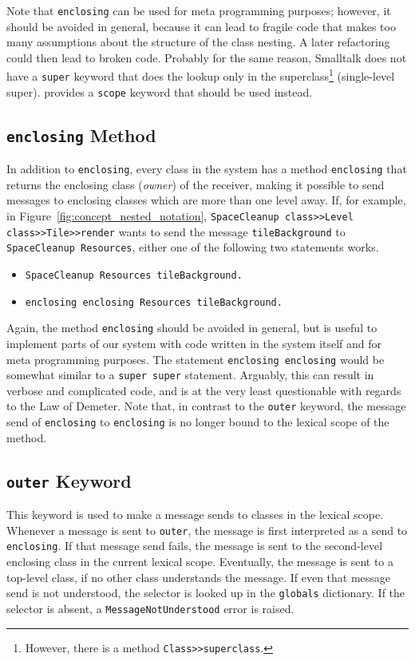 Note that \texttt{enclosing} can be used for meta programming purposes; however, it should be avoided in general, because it can lead to fragile code that makes too many assumptions about the structure of the class nesting. A later refactoring could then lead to broken code. Probably for the same reason, Smalltalk does not have a \texttt{super} keyword that does the lookup only in the superclass\footnote{However, there is a method \texttt{Class>>superclass}.} (single-level super). \msname provides a \texttt{scope} keyword that should be used instead.

\subsection{\texttt{enclosing} Method}
In addition to \texttt{enclosing}, every class in the system has a method \texttt{enclosing} that returns the enclosing class (\emph{owner}) of the receiver, making it possible to send messages to enclosing classes which are more than one level away. If, for example, in Figure~\ref{fig:concept_nested_notation}, \texttt{SpaceCleanup class>>Level class>>Tile>>render} wants to send the message \texttt{tileBackground} to \texttt{SpaceCleanup Resources}, either one of the following two statements works.

\begin{itemize}
	\item \texttt{SpaceCleanup Resources tileBackground.}
	\item \texttt{enclosing enclosing Resources tileBackground.}
\end{itemize}

Again, the method \texttt{enclosing} should be avoided in general, but is useful to implement parts of our system with code written in the system itself and for meta programming purposes. The statement \texttt{enclosing enclosing} would be somewhat similar to a \texttt{super super} statement. Arguably, this can result in verbose and complicated code, and is at the very least questionable with regards to the Law of Demeter. Note that, in contrast to the \texttt{outer} keyword, the message send of \texttt{enclosing} to \texttt{enclosing} is no longer bound to the lexical scope of the method.

\subsection{\texttt{outer} Keyword}
\label{sec:concept_outer}
This keyword is used to make a message sends to classes in the lexical scope. Whenever a message is sent to \texttt{outer}, the message is first interpreted as a send to \texttt{enclosing}. If that message send fails, the message is sent to the second-level enclosing class in the current lexical scope. Eventually, the message is sent to a top-level class, if no other class understands the message. If even that message send is not understood, the selector is looked up in the \texttt{globals} dictionary. If the selector is absent, a \texttt{MessageNotUnderstood} error is raised.

